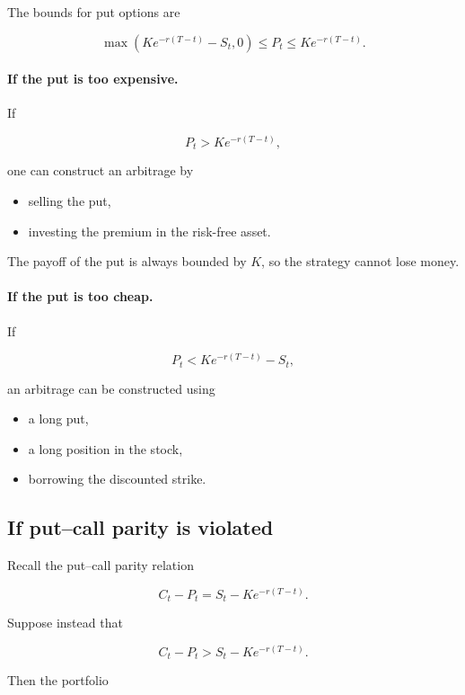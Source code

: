 \documentclass[11pt]{article}
\newcommand{\1}{\mathbf{1}}
\theoremstyle{plain}
\theoremstyle{definition}
\theoremstyle{remark}
\begin{document}
The bounds for put options are

\[
\max(K e^{-r(T-t)}-S_t,0)
\le
P_t
\le
K e^{-r(T-t)}.
\]

\paragraph{If the put is too expensive.}

If

\[
P_t > K e^{-r(T-t)},
\]

one can construct an arbitrage by

\begin{itemize}[leftmargin=1.4em]
\item selling the put,
\item investing the premium in the risk-free asset.
\end{itemize}

The payoff of the put is always bounded by \(K\),
so the strategy cannot lose money.

\paragraph{If the put is too cheap.}

If

\[
P_t < K e^{-r(T-t)} - S_t,
\]

an arbitrage can be constructed using

\begin{itemize}[leftmargin=1.4em]
\item a long put,
\item a long position in the stock,
\item borrowing the discounted strike.
\end{itemize}

\subsection{If put--call parity is violated}

Recall the put--call parity relation

\[
C_t - P_t = S_t - K e^{-r(T-t)}.
\]

Suppose instead that

\[
C_t - P_t > S_t - K e^{-r(T-t)} .
\]

Then the portfolio
\end{document}
